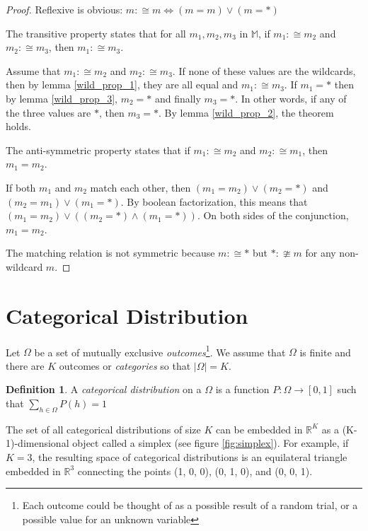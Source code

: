 \documentclass[twoside]{article}
\theoremstyle{plain}%
\theoremstyle{definition}
\newtheorem{definition}{Definition}[section]
\theoremstyle{remark}
\begin{document}
\begin{proof}
Reflexive is obvious: \(m :\cong m \Longleftrightarrow (m = m) \vee (m = \ast)\)

The transitive property states that for all \(m_1, m_2, m_3\) in \(\mathbb{M}\), if \(m_1 :\cong m_2\) and \(m_2 :\cong m_3\), then \(m_1 :\cong m_3\).

Assume that \(m_1 :\cong m_2\) and \(m_2 :\cong m_3\). If none of these values are the wildcards, then by lemma \ref{wild_prop_1}, they are all equal and \(m_1 :\cong m_3\). If \(m_1 = \ast\) then by lemma \ref{wild_prop_3}, \(m_2 = \ast\) and finally \(m_3 = \ast\). In other words, if any of the three values are \(\ast\), then \(m_3 = \ast\). By lemma \ref{wild_prop_2}, the theorem holds.

The anti-symmetric property states that if \(m_1 :\cong m_2\) and \(m_2 :\cong m_1\), then \(m_1 = m_2\).

If both \(m_1\) and \(m_2\) match each other, then \((m_1 = m_2) \vee (m_2 = \ast)\) and \((m_2 = m_1) \vee (m_1 = \ast)\). By boolean factorization, this means that \((m_1 = m_2) \vee ((m_2 = \ast) \wedge (m_1 = \ast))\). On both sides of the conjunction, \(m_1 = m_2\).

The matching relation is not symmetric because \(m :\cong \ast\) but \(\ast :\ncong m\) for any non-wildcard \(m\).
\end{proof}

\section{Categorical Distribution}

Let \(\Omega\) be a set of mutually exclusive \textit{outcomes}\footnote{Each outcome could be thought of as a possible result of a random trial, or a possible value for an unknown variable}. We assume that \(\Omega\) is finite and there are \(K\) outcomes or \textit{categories} so that \(|\Omega| = K\).

\begin{definition}
\label{def:categorical_abs}
A \textit{categorical distribution} on a \(\Omega\) is a function \(P: \Omega \rightarrow [0, 1]\) such that \(\sum_{h \in \Omega} P(h) = 1\)
\end{definition}

The set of all categorical distributions of size \(K\) can be embedded in \(\mathbb{R}^K\) as a (K-1)-dimensional object called a simplex (see figure \ref{fig:simplex}). For example, if \(K = 3\), the resulting space of categorical distributions is an equilateral triangle embedded in \(\mathbb{R}^3\) connecting the points (1, 0, 0), (0, 1, 0), and (0, 0, 1).
\end{document}
